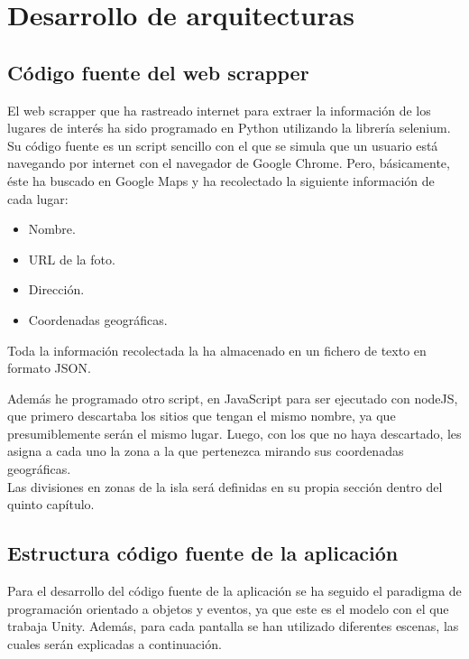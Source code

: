 \documentclass{report}
\begin{document}
\chapter{Desarrollo de arquitecturas}
\section{Código fuente del web scrapper}
El web scrapper que ha rastreado internet para extraer la información de los lugares de interés ha sido programado en Python utilizando la librería selenium.\\
Su código fuente es un script sencillo con el que se simula que un usuario está navegando por internet con el navegador de Google Chrome. Pero, básicamente, éste ha buscado en Google Maps y ha recolectado la siguiente información de cada lugar:
\begin{itemize}
    \item Nombre.
    \item URL de la foto.
    \item Dirección.
    \item Coordenadas geográficas.
\end{itemize}
Toda la información recolectada la ha almacenado en un fichero de texto en formato JSON.

Además he programado otro script, en JavaScript para ser ejecutado con nodeJS, que primero descartaba los sitios que tengan el mismo nombre, ya que presumiblemente serán el mismo lugar. Luego, con los que no haya descartado, les asigna a cada uno la zona a la que pertenezca mirando sus coordenadas geográficas.\\
Las divisiones en zonas de la isla será definidas en su propia sección dentro del quinto capítulo. 
\section{Estructura código fuente de la aplicación}
Para el desarrollo del código fuente de la aplicación se ha seguido el paradigma de programación orientado a objetos y eventos, ya que este es el modelo con el que trabaja Unity. Además, para cada pantalla se han utilizado diferentes escenas, las cuales serán explicadas a continuación.\\
\end{document}
